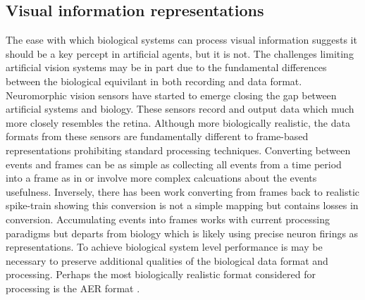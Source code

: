 

\subsection{Visual information representations}

The ease with which biological systems can process visual information suggests it should be a key percept in artificial agents, but it is not.
The challenges limiting artificial vision systems may be in part due to the fundamental differences between the biological equivilant in both recording and data format.
Neuromorphic vision sensors have started to emerge closing the gap between artificial systems and biology\cite{mahowald1992vlsi}.
These sensors record and output data which much more closely resembles the retina\cite{akolkar2015can}. 
Although more biologically realistic, the data formats from these sensors are fundamentally different to frame-based representations prohibiting standard processing techniques. 
Converting between events and frames can be as simple as collecting all events from a time period into a frame as in \cite{kogler2009bio, schraml2010dynamic} or involve more complex calcuations about the events usefulness\cite{mueggler2015lifetime}.
Inversely, there has been work converting from frames back to realistic spike-train\cite{afshar2013ripple} showing this conversion is not a simple mapping but contains losses in conversion\cite{akolkar2015can}. 
Accumulating events into frames works with current processing paradigms but departs from biology which is likely using precise neuron firings as representations\cite{akolkar2015can}.
To achieve biological system level performance is may be necessary to preserve additional qualities of the biological data format and processing. 
Perhaps the most biologically realistic format considered for processing is the AER format \cite{mahowald1992vlsi}.
